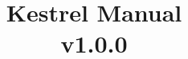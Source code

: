 \documentclass[a4paper]{article}
\title{Kestrel Manual\\v1.0.0}
\date{}
\begin{document}
\maketitle{}

\tableofcontents{}
\clearpage


\clearpage


\clearpage


\clearpage


\clearpage


\clearpage


\clearpage


\clearpage


\end{document}
